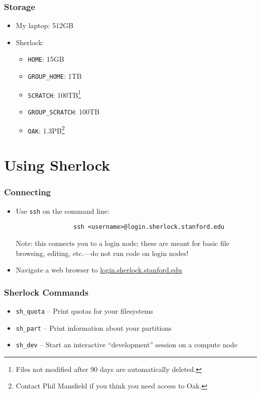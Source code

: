 \documentclass[aspectratio=169]{beamer}
\begin{document}
\begin{frame}
	\frametitle{Storage}
	\begin{itemize}
		\item My laptop: 512GB
		\item Sherlock:
			\begin{itemize}
				\item \texttt{HOME}: 15GB
				\item \texttt{GROUP\_HOME}: 1TB
				\item \texttt{SCRATCH}: 100TB\footnote{Files not modified after 90 days are automatically deleted.}
				\item \texttt{GROUP\_SCRATCH}: 100TB\footnotemark[\value{footnote}]
				\item \texttt{OAK}: 1.3PB\footnote{Contact Phil Mansfield if you think you need access to Oak.}
			\end{itemize}
	\end{itemize}
\end{frame}


\section{Using Sherlock}

\frame{\sectionpage}

\begin{frame}[fragile]
	\frametitle{Connecting}
	\begin{itemize}
		\item Use \texttt{ssh} on the command line:
			\begin{verbatim}
				ssh <username>@login.sherlock.stanford.edu
			\end{verbatim}
			Note: this connects you to a login node; these are meant for basic file browsing, editing, etc.---do not run code on login nodes!
		\item Navigate a web browser to \url{login.sherlock.stanford.edu}
	\end{itemize}
\end{frame}

\begin{frame}
	\frametitle{Sherlock Commands}
	\begin{itemize}
		\item \texttt{sh\_quota} -- Print quotas for your filesystems
		\item \texttt{sh\_part} -- Print information about your partitions
		\item \texttt{sh\_dev} -- Start an interactive ``development'' session on a compute node
	\end{itemize}
\end{frame}
\end{document}
